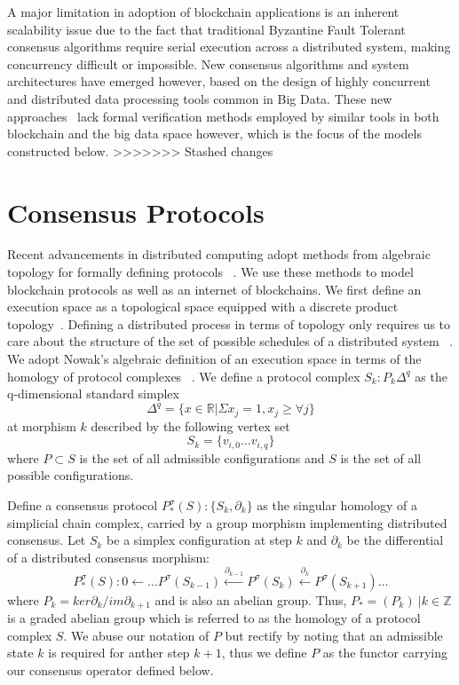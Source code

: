 \documentclass[runningheads]{llncs}
\begin{document}
A major limitation in adoption of blockchain applications is an inherent scalability issue due to the fact that traditional Byzantine Fault Tolerant consensus algorithms require serial execution across a distributed system, making concurrency difficult or impossible. New consensus algorithms and system architectures have emerged however, based on the design of highly concurrent and distributed data processing tools common in Big Data. These new approaches~\cite{ref_url3,ref_url6} lack formal verification methods employed by similar tools in both blockchain and the big data space however, which is the focus of the models constructed below.
>>>>>>> Stashed changes

\section{Consensus Protocols}
Recent advancements in distributed computing adopt methods from algebraic topology for formally defining protocols ~\cite{ref_article1,ref_article2}. We use these methods to model blockchain protocols as well as an internet of blockchains. We first define an execution space as a topological space equipped with a discrete product topology~\cite{ref_article3}. Defining a distributed process in terms of topology only requires us to care about the structure of the set of possible schedules of a distributed system ~\cite{ref_article4}. We adopt Nowak's algebraic definition of an execution space in terms of the homology of protocol complexes ~\cite{ref_article2}. We define a protocol complex $S_k: P_k{\Delta^q}$ as the q-dimensional standard simplex
\begin{equation}
\Delta^q = \{x \in \mathbb{R} | \Sigma x_j = 1, x_j \geq \forall j \}
\end{equation} 
at morphism $k$ described by the following vertex set
\begin{equation}
S_k = \{v_{i,0} \dots v_{i,q}\}
\end{equation}
where $P \subset S$ is the set of all admissible configurations and $S$ is the set of all possible configurations.

Define a consensus protocol $P^\sigma_{*}(S):\{S_k, \partial_k\}$ as the singular homology of a simplicial chain complex, carried by a group morphism implementing distributed consensus. Let $S_k$ be a simplex configuration at step $k$ and $\partial_k$ be the differential of a distributed consensus morphism:
\begin{equation}
P^\sigma_{*}(S): 0 \leftarrow \dots P^\sigma(S_{k-1})\xleftarrow {\partial_{k-1}} P^\sigma(S_{k})\xleftarrow {\partial_{k}} P^\sigma(S_{k+1}) \dots
\end{equation}
where $P_k = ker \partial_k / im \partial_{k+1}$ and is also an abelian group. Thus, $P_*= (P_k) \ | k \in \mathbb{Z}$ is a graded abelian group which is referred to as the homology of a protocol complex $S$. We abuse our notation of $P$ but rectify by noting that an admissible state $k$ is required for anther step $k + 1$, thus we define $P$ as the functor carrying our consensus operator defined below.
\end{document}
